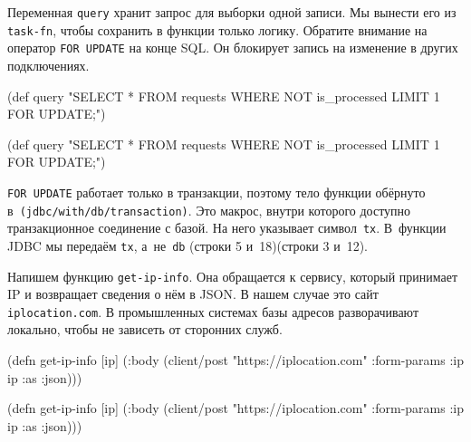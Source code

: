 \fi


Переменная \verb|query| хранит запрос для выборки одной записи. Мы вынести его
из \verb|task-fn|, чтобы сохранить в функции только логику. Обратите внимание на
оператор \verb|FOR UPDATE| на конце SQL. Он блокирует запись на изменение в
других подключениях.

\ifnarrow

\begin{english}
  \begin{clojure}
(def query
  "SELECT * FROM requests
   WHERE NOT is_processed
   LIMIT 1 FOR UPDATE;")
  \end{clojure}
\end{english}

\else

\begin{english}
  \begin{clojure}
(def query
  "SELECT * FROM requests WHERE NOT is_processed
   LIMIT 1 FOR UPDATE;")
  \end{clojure}
\end{english}

\fi

\verb|FOR UPDATE| работает только в транзакции, поэтому тело функции обёрнуто
в~\texttt{(jdbc/with\-/db\-/transaction)}. Это макрос, внутри которого доступно
транзакционное соединение с базой. На него указывает символ~\verb|tx|. В~функции
JDBC мы передаём \verb|tx|, а~не~\verb|db| \ifnarrow(строки 5 и~18)\else(строки 3 и~12)\fi.


Напишем функцию \verb|get-ip-info|. Она обращается к сервису, который принимает
IP и возвращает сведения о нём в JSON. В нашем случае это сайт
\verb|iplocation.com|. В промышленных системах базы адресов разворачивают
локально, чтобы не зависеть от сторонних служб.

\ifnarrow

\begin{english}
  \begin{clojure}
(defn get-ip-info [ip]
  (:body (client/post
           "https://iplocation.com"
           {:form-params {:ip ip}
            :as :json})))
  \end{clojure}
\end{english}

\else

\begin{english}
  \begin{clojure}
(defn get-ip-info [ip]
  (:body (client/post "https://iplocation.com"
                      {:form-params {:ip ip}
                       :as :json})))
  \end{clojure}
\end{english}

